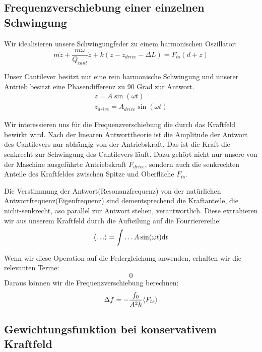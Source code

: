 \subsection{Frequenzverschiebung einer einzelnen Schwingung}

Wir idealisieren unsere Schwingungfeder zu einem harmonischen Oszillator:
\begin{equation}
	m \ddot{z} + \frac{m \omega}{Q_{cant}} \dot{z} + k \left( z-z_{drive} - \Delta L \right) = F_{ts} (d+z) \label{federgleichung} 
\end{equation}

Unser Cantilever besitzt nur eine rein harmonische Schwingung und unserer Antrieb besitzt eine Phasendifferenz zu 90 Grad zur Antwort.
\begin{gather}
	z = A \sin ( \omega t) \\ 
	z_{drive} = A_{drive} \sin ( \omega t)
\end{gather}

Wir interessieren uns für die Frequenzverschiebung die durch das Kraftfeld bewirkt wird.
Nach der linearen Antworttheorie ist die Amplitude der Antwort des Cantilevers nur abhängig von der Antriebskraft. Das ist die Kraft die senkrecht zur Schwingung des Cantilevers läuft. Dazu gehört nicht nur unsere von der Maschine ausgeführte Antriebskraft $F_{drive}$, sondern auch die senkrechten Anteile des Kraftfeldes zwischen Spitze und Oberfläche $F_{ts}$.

Die Verstimmung der Antwort(Resonanzfrequenz) von der natürlichen Antwortfrequenz(Eigenfrequenz) sind dementsprechend die Kraftanteile, die nicht-senkrecht, aso parallel zur Antwort stehen, verantwortlich. 
Diese extrahieren wir aus unserem Kraftfeld durch die Aufteilung auf die Fourrierereihe:
\begin{equation}
	\mitlungz{ \dots } = \int \dots A \sin (\omega t) \mathrm{d} t
\end{equation}

Wenn wir diese Operation auf die Federgleichung anwenden, erhalten wir die relevanten Terme:
\begin{equation}
	0
\end{equation}
Daraus können wir die Frequenzverschiebung berechnen:
\begin{equation}
	\Delta f = - \frac{f_0}{A^2 k } \langle F_{ts} \rangle \label{gl:frequenzverschiebung}
\end{equation}


\subsection{Gewichtungsfunktion bei konservativem Kraftfeld}

